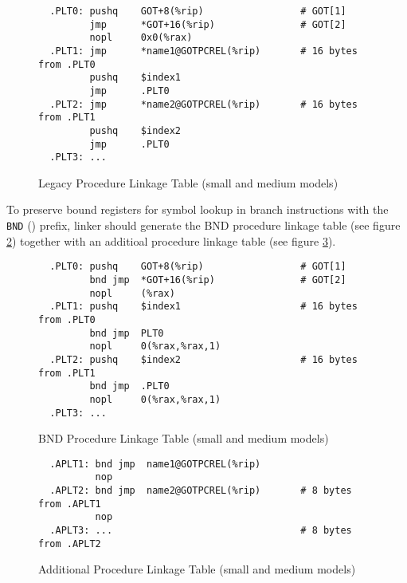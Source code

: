 \begin{figure}[H]
\Hrule
\caption{Legacy Procedure Linkage Table (small and medium models)}
\label{legacy_small_med_plt}
\begin{footnotesize}
\begin{verbatim}
  .PLT0: pushq    GOT+8(%rip)                 # GOT[1]
         jmp      *GOT+16(%rip)               # GOT[2]
         nopl     0x0(%rax)
  .PLT1: jmp      *name1@GOTPCREL(%rip)       # 16 bytes from .PLT0
         pushq    $index1
         jmp      .PLT0
  .PLT2: jmp      *name2@GOTPCREL(%rip)       # 16 bytes from .PLT1
         pushq    $index2
         jmp      .PLT0
  .PLT3: ...
\end{verbatim}%
\end{footnotesize}
\Hrule
\end{figure}

To preserve bound registers for symbol lookup in branch instructions
with the \texttt{BND} () prefix, linker should generate the
BND procedure linkage table (see figure \ref{bnd_small_med_plt}) together
with an additioal procedure linkage table (see figure
\ref{ext_small_med_plt}).

\begin{figure}[H]
\Hrule
\caption{BND Procedure Linkage Table (small and medium models)}
\label{bnd_small_med_plt}
\begin{footnotesize}
\begin{verbatim}
  .PLT0: pushq    GOT+8(%rip)                 # GOT[1]
         bnd jmp  *GOT+16(%rip)               # GOT[2]
         nopl     (%rax)
  .PLT1: pushq    $index1                     # 16 bytes from .PLT0
         bnd jmp  PLT0
         nopl     0(%rax,%rax,1)
  .PLT2: pushq    $index2                     # 16 bytes from .PLT1
         bnd jmp  .PLT0
         nopl     0(%rax,%rax,1)
  .PLT3: ...
\end{verbatim}%
\end{footnotesize}
\Hrule
\end{figure}

\begin{figure}[H]
\Hrule
\caption{Additional Procedure Linkage Table (small and medium models)}
\label{ext_small_med_plt}
\begin{footnotesize}
\begin{verbatim}
  .APLT1: bnd jmp  name1@GOTPCREL(%rip)
          nop
  .APLT2: bnd jmp  name2@GOTPCREL(%rip)       # 8 bytes from .APLT1
          nop
  .APLT3: ...                                 # 8 bytes from .APLT2
\end{verbatim}%
\end{footnotesize}
\Hrule
\end{figure}

